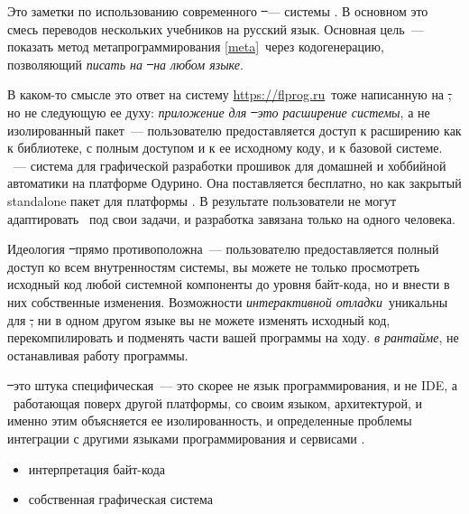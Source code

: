 {}

Это заметки по использованию современного \st\ --- системы \ph. В основном это смесь переводов нескольких учебников
на русский язык. Основная цель\ --- показать метод метапрограммирования \ref{meta}\ через кодогенерацию,
позволяющий \emph{писать на \st\ \textit{на любом языке}}.

В каком-то смысле это ответ на систему \url{https://flprog.ru}\ тоже написанную на \st, но не следующую ее духу:
\emph{приложение для \st\ это \textit{расширение системы}}, а не изолированный пакет\ --- пользователю предоставляется доступ к расширению
как к библиотеке, с полным доступом и к ее исходному коду,
и к базовой системе. \fl\ --- система для графической разработки прошивок для домашней и хоббийной автоматики на платформе Одурино.
Она поставляется бесплатно, но как закрытый standalone пакет для платформы \win{}.
В результате пользователи не могут адаптировать \fl\ под
свои задачи, и разработка завязана только на одного человека.

Идеология \st\ прямо противоположна\ --- пользователю предоставляется полный доступ ко всем внутренностям системы, вы можете не только
просмотреть исходный код любой системной компоненты до уровня байт-кода, но и внести в них собственные изменения. Возможности
\emph{интерактивной отладки}\ уникальны для \st, ни в одном другом языке вы не можете изменять исходный код, перекомпилировать и подменять
части вашей программы на ходу. \emph{в рантайме}, не останавливая работу программы.

\st\ это штука специфическая\ --- это скорее не язык программирования, и не IDE, а \ работающая поверх другой платформы,
со своим языком, архитектурой, и именно этим объясняется ее изолированность, и определенные проблемы интеграции
с другими языками программирования и сервисами .

\begin{itemize}[nosep]
\item интерпретация байт-кода
\item собственная графическая система
\end{itemize}

